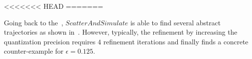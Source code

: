 <<<<<<< HEAD
% 
=======
\begin{example}

Going back to the~, $ScatterAndSimulate$ is able to
    find several abstract trajectories as shown
    in~. However, typically, the refinement by
    increasing the quantization precision requires $4$ refinement
    iterations and finally finds a concrete counter-example for
    $\epsilon=0.125$.
\end{example}


%
%


